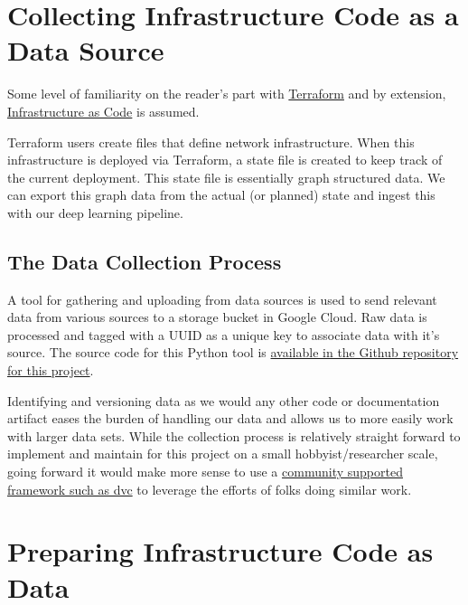 \clearpage
\section{\label{sec:collection}Collecting Infrastructure Code as a Data Source}

\justifying
Some level of familiarity on the reader's part with \href{https://www.terraform.io/intro/index.html}{Terraform} and
by extension, \href{https://learn.hashicorp.com/tutorials/terraform/infrastructure-as-code}{Infrastructure as Code} is assumed.
\vspace{2mm}

\justifying
Terraform users create files that define network infrastructure. When this infrastructure is deployed via Terraform, a state file is created to keep track of the current deployment. This state file is essentially graph structured data. We can export this graph data from the actual (or planned) state and ingest this
with our deep learning pipeline.

\subsection{\label{sec:collect}The Data Collection Process}

\justifying
A tool for gathering and uploading from data sources is used to send relevant data from various sources to a storage bucket in
Google Cloud. Raw data is processed and tagged with a UUID as a unique key to associate data with it's source. The source code for this Python tool is 
\href{https://github.com/devsecfranklin/model-graph-neural-net/tree/main/src}{available in the Github repository for this project}.
\vspace{2mm}

\justifying
Identifying and versioning data as we would any other code or documentation artifact eases the
burden of handling our data and allows us to more easily work with larger data sets. While the collection process is relatively straight
forward to implement and maintain for this project on a small hobbyist/researcher scale, going forward it would make more sense to use
a \href{https://github.com/iterative/dvc}{community supported framework such as dvc} to leverage the efforts of folks doing similar work.

\section{\label{sec:iacdata}Preparing Infrastructure Code as Data}

